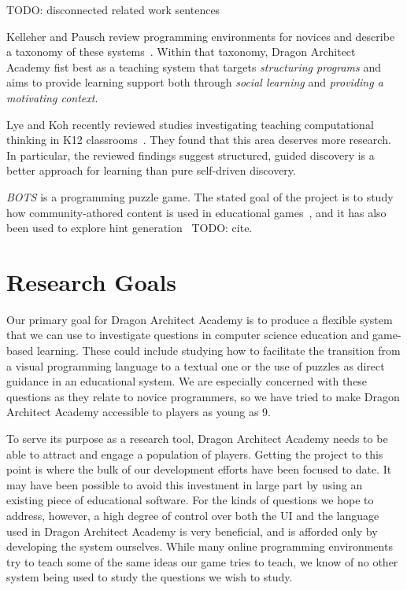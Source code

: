 \documentclass{sig-alternate}
\newcommand{\TODO}[1]{{\color{red} TODO: #1}}
\newcommand{\gametitle}{{\color{RoyalPurple} Dragon Architect Academy}}
\begin{document}
\TODO{disconnected related work sentences}

Kelleher and Pausch review programming environments for novices and describe a taxonomy of these systems~\cite{kelleher2005lowering}. Within that taxonomy, \gametitle{} fist best as a teaching system that targets \emph{structuring programs} and aims to provide learning support both through \emph{social learning} and \emph{providing a motivating context}.

Lye and Koh recently reviewed studies investigating teaching computational thinking in K12 classrooms~\cite{lye2014review}. They found that this area deserves more research. In particular, the reviewed findings suggest structured, guided discovery is a better approach for learning than pure self-driven discovery.

\emph{BOTS} is a programming puzzle game. The stated goal of the project is to study how community-athored content is used in educational games~\cite{hickspart14}, and it has also been used to explore hint generation~\TODO{cite}.


\section{Research Goals}
\label{sec:goals}
Our primary goal for \gametitle{} is to produce a flexible system that we can use to investigate questions in computer science education and game-based learning. These could include studying how to facilitate the transition from a visual programming language to a textual one or the use of puzzles as direct guidance in an educational system. We are especially concerned with these questions as they relate to novice programmers, so we have tried to make \gametitle{} accessible to players as young as 9.

To serve its purpose as a research tool, \gametitle{} needs to be able to attract and engage a population of players. Getting the project to this point is where the bulk of our development efforts have been focused to date. It may have been possible to avoid this investment in large part by using an existing piece of educational software. For the kinds of questions we hope to address, however, a high degree of control over both the UI and the language used in \gametitle{} is very beneficial, and is afforded only by developing the system ourselves. While many online programming environments try to teach some of the same ideas our game tries to teach, we know of no other system being used to study the questions we wish to study. 
\end{document}
